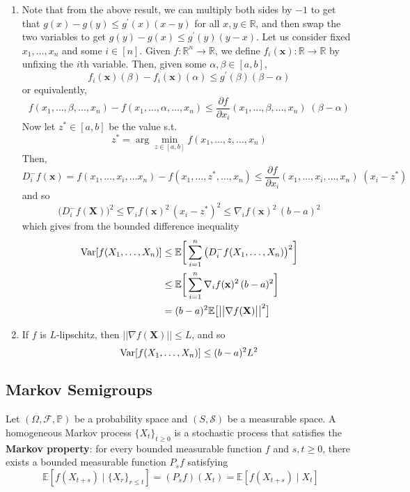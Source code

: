 \begin{solution}
\begin{enumerate}
      \item Note that from the above result, we can multiply both sides by $-1$ to get that $g(x) - g(y) \leq g^\prime (x) (x - y)$ for all $x, y \in \mathbb{R}$, and then swap the two variables to get $g(y) - g(x) \leq g^\prime (y) (y - x)$. Let us consider fixed $x_1, \ldots, x_n$ and some $i \in [n]$. Given $f: \mathbb{R}^n \rightarrow \mathbb{R}$, we define $f_i (\mathbf{x}): \mathbb{R} \rightarrow \mathbb{R}$ by unfixing the $i$th variable. Then, given some $\alpha, \beta \in [a, b]$, 
      \[f_i (\mathbf{x}) (\beta) - f_i (\mathbf{x}) (\alpha) \leq g^\prime (\beta) (\beta - \alpha)\]
      or equivalently, 
      \[f(x_1, \ldots, \beta, \ldots, x_n) - f(x_1, \ldots, \alpha, \ldots, x_n) \leq \frac{\partial f}{\partial x_i} (x_1, \ldots, \beta, \ldots, x_n) \; (\beta - \alpha)\]
      Now let $z^\ast \in [a, b]$ be the value s.t. 
      \[z^\ast = \arg \min_{z \in [a, b]} f(x_1, \ldots, z, \ldots, x_n) \]
      Then, 
      \[D_i^- f(\mathbf{x}) = f(x_1, \ldots, x_i, \ldots x_n) - f(x_1, \ldots, z^\ast, \ldots, x_n) \leq \frac{\partial f}{\partial x_i} (x_1, \ldots, x_i, \ldots, x_n) \; (x_i - z^\ast)\]
      and so 
      \[\big( D_i^- f(\mathbf{X}) \big)^2 \leq \nabla_i f (\mathbf{x})^2 \, (x_i - z^\ast)^2 \leq \nabla_i f (\mathbf{x})^2 \, (b - a)^2\]
      which gives from the bounded difference inequality 
      \begin{align*}
          \operatorname{Var}[f(X_1, \ldots, X_n)] & \leq \mathbb{E} \bigg[ \sum_{i=1}^n \big( D_i^- f(X_1, \ldots, X_n) \big)^2 \bigg] \\
          & \leq \mathbb{E} \bigg[ \sum_{i=1}^n \nabla_i f (\mathbf{x})^2 \, (b - a)^2 \bigg] \\
          & = (b - a)^2 \mathbb{E} \big[ \big| \big| \nabla f(\mathbf{X})\big| \big|^2 \big]
      \end{align*}
      
      \item If $f$ is $L$-lipschitz, then $||\nabla f(\mathbf{X})|| \leq L$, and so  
      \[\operatorname{Var}[f(X_1, \ldots, X_n)] \leq (b - a)^2 L^2\]
  \end{enumerate}
  \end{solution}

\subsection{Markov Semigroups}

  \begin{definition}
  Let $(\Omega, \mathcal{F}, \mathbb{P})$ be a probability space and $(S, \mathcal{S})$ be a measurable space. A homogeneous Markov process $\{X_t\}_{t \geq 0}$ is a stochastic process that satisfies the \textbf{Markov property}: for every bounded measurable function $f$ and $s, t \geq 0$, there exists a bounded measurable function $P_s f$ satisfying 
  \[\mathbb{E}[f (X_{t + s}) \mid \{X_r\}_{r \leq t}] = (P_s f) (X_t) = \mathbb{E}[ f(X_{t + s}) \mid X_t]\]
  \end{definition}

